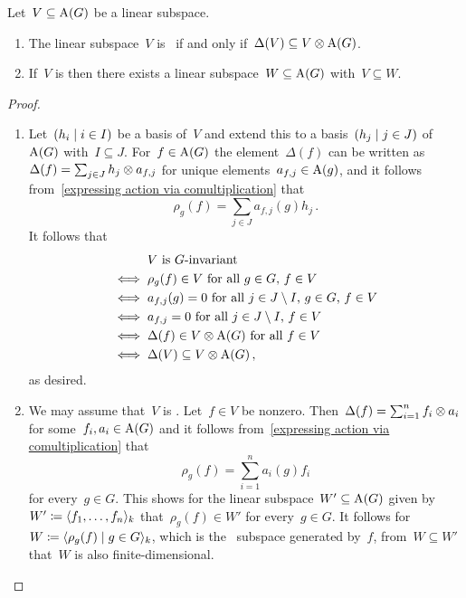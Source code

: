 \begin{lemma}
\label{invariant subspaces of coordinate ring}
  Let~$V \subseteq \operatorname{A}(G)$ be a linear subspace.
  \begin{enumerate}
    \item
      The linear subspace~$V$ is~ if and only if~$\Delta(V) \subseteq V \otimes \operatorname{A}(G)$.
    \item
      If~$V$ is {\fd} then there exists a {\fd} linear subspace~$W \subseteq \operatorname{A}(G)$ with~$V \subseteq W$.
  \end{enumerate}
\end{lemma}


\begin{proof}
  \leavevmode
  \begin{enumerate}
    \item
      Let~$(h_i \suchthat i \in I)$ be a basis of~$V$ and extend this to a basis~$(h_j \suchthat j \in J)$ of~$\operatorname{A}(G)$ with~$I \subseteq J$.
      For~$f \in \operatorname{A}(G)$ the element~$\Delta(f)$ can be written as~$\Delta(f) = \sum_{j \in J} h_j \otimes a_{f,j}$ for unique elements~$a_{f,j} \in \operatorname{A}(g)$, and it follows from~\eqref{expressing action via comultiplication} that
      \[
          \rho_g(f)
        = \sum_{j \in J} a_{f,j}(g) h_j \,.
      \]
      It follows that
      \begin{align*}
            {}& \text{$V$ is~\dash{$G$}{invariant}} \\
        \iff{}& \text{$\rho_g(f) \in V$ for all~$g \in G$,~$f \in V$} \\
        \iff{}& \text{$a_{f,j}(g) = 0$ for all~$j \in J \setminus I$,~$g \in G$,~$f \in V$} \\
        \iff{}& \text{$a_{f,j} = 0$ for all~$j \in J \setminus I$,~$f \in V$} \\
        \iff{}& \text{$\Delta(f) \in V \tensor \coord(G)$ for all~$f \in V$}  \\
        \iff{}& \Delta(V) \subseteq V \tensor \coord(G) \,,
      \end{align*}
      as desired.
    \item
      We may assume that~$V$ is .
      Let~$f \in V$ be nonzero.
      Then~$\Delta(f) = \sum_{i=1}^n f_i \otimes a_i$ for some~$f_i, a_i \in \operatorname{A}(G)$ and it follows from~\eqref{expressing action via comultiplication} that
      \[
          \rho_g(f)
        = \sum_{i=1}^n a_i(g) f_i
      \]
      for every~$g \in G$.
      This shows for the {\fd} linear subspace~$W' \subseteq \operatorname{A}(G)$ given by~$W' \coloneqq \langle f_1, \dotsc, f_n\rangle_k$ that~$\rho_g(f) \in W'$ for every~$g \in G$.
      It follows for~$W \defined \gen{ \rho_g(f) \suchthat g \in G }_k$, which is the~ subspace generated by~$f$, from~$W \subseteq W'$ that~$W$ is also finite-dimensional.
    \qedhere
  \end{enumerate}
\end{proof}


